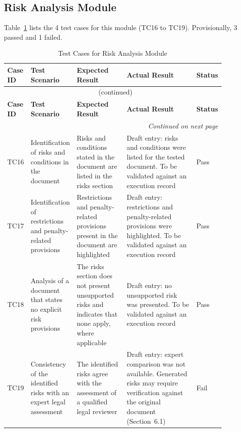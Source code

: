 \documentclass[12pt,a4paper,oneside]{report}
\begin{document}
\subsection{Risk Analysis Module}
Table~\ref{tab:risk} lists the 4 test cases for this module (TC16 to TC19). Provisionally, 3 passed and 1 failed.
{\footnotesize
\setlength{\tabcolsep}{3pt}
\renewcommand{\arraystretch}{1.15}
\begin{longtable}{|p{0.075\linewidth}|p{0.19\linewidth}|p{0.23\linewidth}|p{0.32\linewidth}|p{0.08\linewidth}|}
\caption{Test Cases for Risk Analysis Module}\label{tab:risk}\\
\hline
\textbf{Case ID} & \textbf{Test Scenario} & \textbf{Expected Result} & \textbf{Actual Result} & \textbf{Status}\\
\hline
\endfirsthead
\multicolumn{5}{c}{\tablename~\thetable{} (continued)}\\
\hline
\textbf{Case ID} & \textbf{Test Scenario} & \textbf{Expected Result} & \textbf{Actual Result} & \textbf{Status}\\
\hline
\endhead
\hline
\multicolumn{5}{r}{\emph{Continued on next page}}\\
\endfoot
\hline
\endlastfoot
TC16 & Identification of risks and conditions in the document & Risks and conditions stated in the document are listed in the risks section & Draft entry: risks and conditions were listed for the tested document. To be validated against an execution record & Pass\\
\hline
TC17 & Identification of restrictions and penalty-related provisions & Restrictions and penalty-related provisions present in the document are highlighted & Draft entry: restrictions and penalty-related provisions were highlighted. To be validated against an execution record & Pass\\
\hline
TC18 & Analysis of a document that states no explicit risk provisions & The risks section does not present unsupported risks and indicates that none apply, where applicable & Draft entry: no unsupported risk was presented. To be validated against an execution record & Pass\\
\hline
TC19 & Consistency of the identified risks with an expert legal assessment & The identified risks agree with the assessment of a qualified legal reviewer & Draft entry: expert comparison was not available. Generated risks may require verification against the original document (Section~6.1) & Fail\\
\end{longtable}
}
\end{document}
